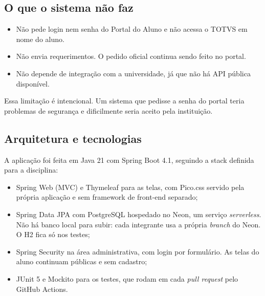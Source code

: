\documentclass[12pt,a4paper]{article}
\begin{document}
\subsection{O que o sistema não faz}

\begin{itemize}
  \item Não pede login nem senha do Portal do Aluno e não acessa o TOTVS em nome do aluno.
  \item Não envia requerimentos. O pedido oficial continua sendo feito no portal.
  \item Não depende de integração com a universidade, já que não há API pública disponível.
\end{itemize}

Essa limitação é intencional. Um sistema que pedisse a senha do portal teria problemas de segurança e
dificilmente seria aceito pela instituição.

\subsection{Arquitetura e tecnologias}

A aplicação foi feita em Java 21 com Spring Boot 4.1, seguindo a stack definida para a disciplina:
\begin{itemize}
  \item Spring Web (MVC) e Thymeleaf para as telas, com Pico.css servido pela própria aplicação e sem
        framework de front-end separado;
  \item Spring Data JPA com PostgreSQL hospedado no Neon, um serviço \emph{serverless}. Não há banco
        local para subir: cada integrante usa a própria \emph{branch} do Neon. O H2 fica só nos testes;
  \item Spring Security na área administrativa, com login por formulário. As telas do aluno continuam
        públicas e sem cadastro;
  \item JUnit 5 e Mockito para os testes, que rodam em cada \emph{pull request} pelo GitHub Actions.
\end{itemize}
\end{document}
